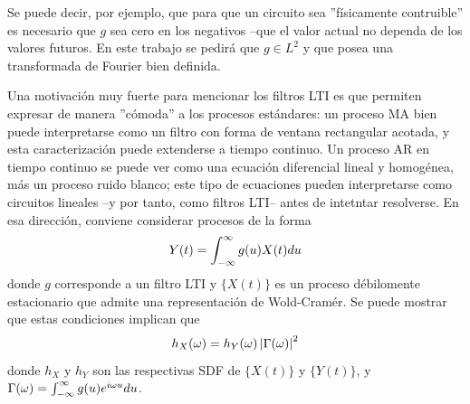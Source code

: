 
Se puede decir, por ejemplo, que para que un circuito sea ''f\'isicamente contruible'' es
necesario que $g$ sea cero en los negativos --que el valor actual no dependa de los valores
futuros. En este trabajo se pedir\'a que $g\in L^{2}$ y que posea una transformada de
Fourier bien definida.



Una motivaci\'on muy fuerte para mencionar los filtros LTI es que permiten expresar de manera
''c\'omoda'' a los procesos est\'andares: un proceso MA 
bien puede interpretarse como un filtro con forma de ventana rectangular
acotada, y esta caracterizaci\'on puede extenderse a tiempo continuo.
Un proceso AR en tiempo continuo se puede ver como una ecuaci\'on diferencial lineal y homog\'enea,
m\'as un proceso ruido blanco; este tipo de ecuaciones pueden interpretarse como circuitos lineales
--y por tanto, como filtros LTI-- antes de intetntar resolverse.
En esa direcci\'on, conviene considerar procesos de la forma
\begin{equation*}
Y(t) = \int_{-\infty}^{\infty} g(u) X(t) du
\end{equation*}
donde $g$ corresponde a un filtro LTI y $\{ X(t) \}$ es un proceso d\'ebilomente estacionario que
admite una representaci\'on de Wold-Cram\'er. Se puede mostrar que estas condiciones implican
que
\begin{equation*}
h_X(\omega) = h_Y(\omega) \left| \Gamma(\omega) \right|^{2}
\end{equation*}
donde $h_X$ y $h_Y$ son las respectivas SDF de $\{X(t)\}$ y $\{Y(t)\}$, y 
$\Gamma(\omega) = \int_{-\infty}^{\infty} g(u) e^{i \omega u} du$.

